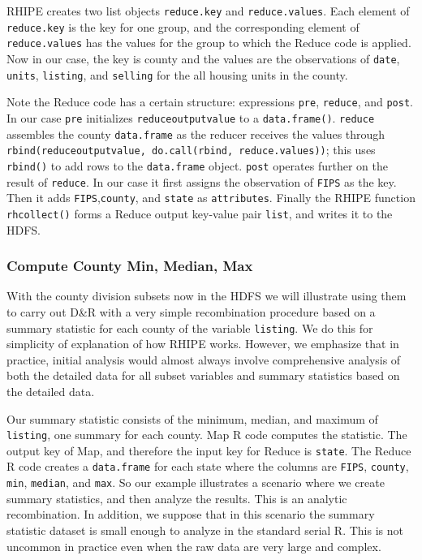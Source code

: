 RHIPE creates two list objects \texttt{reduce.key} and \texttt{reduce.values}.
Each element of \texttt{reduce.key} is the key for one group, and the corresponding
element of \texttt{reduce.values} has the values for the group to which the Reduce
code is applied.  Now in our case, the key is county and the values are the
observations of  \texttt{date}, \texttt{units}, \texttt{listing}, and \texttt{selling}
for the all housing units in the county.

Note the Reduce code has a certain structure: expressions \texttt{pre}, \texttt{reduce},
and \texttt{post}. In our case \texttt{pre} initializes \texttt{reduceoutputvalue} to a
\texttt{data.frame()}. \texttt{reduce} assembles the county \texttt{data.frame} as the
reducer receives the values through \texttt{rbind(reduceoutputvalue, do.call(rbind,
reduce.values))}; this uses \texttt{rbind()} to add rows to the \texttt{data.frame} object.
\texttt{post} operates further on the result of \texttt{reduce}. In our case it first assigns
the observation of \texttt{FIPS} as the key. Then it adds \texttt{FIPS},\texttt{county}, and
\texttt{state} as \texttt{attributes}. Finally the RHIPE function
\texttt{rhcollect()} forms a Reduce output key-value pair \texttt{list}, and writes it to the
HDFS.

\subsubsection{Compute County Min, Median, Max}

With the county division subsets now in the HDFS we will illustrate using them
to carry out D\&R with a very simple recombination procedure based on a
summary statistic for each county of the variable \texttt{listing}.
We do this for simplicity of explanation of how RHIPE works.
However, we emphasize that in practice, initial analysis would
almost always involve comprehensive analysis of both the detailed data for all
subset variables and summary statistics based on the detailed data.

Our summary statistic consists of the minimum, median, and maximum of
\texttt{listing}, one summary for each county. Map R code computes the statistic.
The output key of Map, and therefore the input key for Reduce is \texttt{state}.
The Reduce R code creates a \texttt{data.frame} for each state
where the columns are \texttt{FIPS}, \texttt{county}, \texttt{min}, \texttt{median}, and \texttt{max}.
So our example illustrates a scenario where we create summary statistics, and
then analyze the results. This is an analytic recombination. In addition, we
suppose that in this scenario the summary statistic dataset is small enough to
analyze in the standard serial R. This is not uncommon in practice even when
the raw data are very large and complex.

